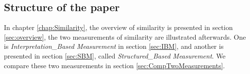 \documentclass[Thesis.tex]{subfiles}
\begin{document}
\subsection{Structure of the paper}
In chapter \ref{chap:Similarity}, the overview of similarity is presented in section \ref{sec:overview}, the two measurements of similarity are illustrated afterwards.  One is \textit{Interpretation\_Based Measurement} in section \ref{sec:IBM}, and another is presented in section \ref{sec:SBM}, called \textit{Structured\_Based Measurement}. We compare these two measurements in section \ref{sec:CompTwoMeasurements}.
\end{document}
